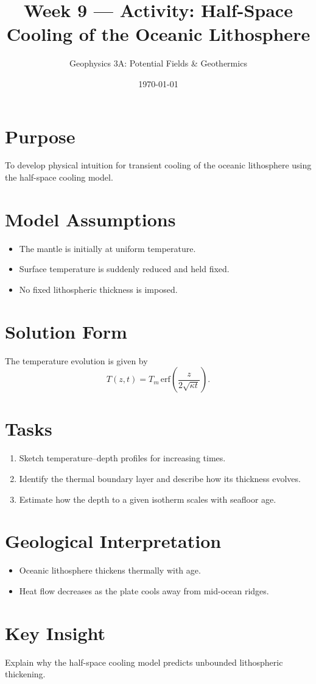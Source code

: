 \documentclass[11pt,a4paper]{article}
\title{Week 9 --- Activity: Half-Space Cooling of the Oceanic Lithosphere}
\author{Geophysics 3A: Potential Fields \& Geothermics}
\date{\today}
\begin{document}
\maketitle

\vspace{1em}

\section*{Purpose}
To develop physical intuition for transient cooling of the oceanic lithosphere
using the half-space cooling model.

\section*{Model Assumptions}
\begin{itemize}
  \item The mantle is initially at uniform temperature.
  \item Surface temperature is suddenly reduced and held fixed.
  \item No fixed lithospheric thickness is imposed.
\end{itemize}

\section*{Solution Form}
The temperature evolution is given by
\[
T(z,t) = T_m \,\mathrm{erf}\!\left(
\frac{z}{2\sqrt{\kappa t}}
\right).
\]

\section*{Tasks}
\begin{enumerate}
  \item Sketch temperature--depth profiles for increasing times.
  \item Identify the thermal boundary layer and describe how its thickness evolves.
  \item Estimate how the depth to a given isotherm scales with seafloor age.
\end{enumerate}

\section*{Geological Interpretation}
\begin{itemize}
  \item Oceanic lithosphere thickens thermally with age.
  \item Heat flow decreases as the plate cools away from mid-ocean ridges.
\end{itemize}

\section*{Key Insight}
Explain why the half-space cooling model predicts unbounded lithospheric thickening.
\end{document}
